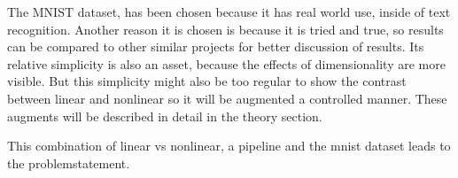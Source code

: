 The MNIST dataset, has been chosen because it has real world use, inside of text recognition. Another reason it is chosen is because it is tried and true, so results can be compared to other similar projects for better discussion of results. Its relative simplicity is also an asset, because the effects of dimensionality are more visible. But this simplicity might also be too regular to show the contrast between linear and nonlinear so it will be augmented a controlled manner. These augments will be described in detail in the theory section. 

This combination of linear vs nonlinear, a pipeline and the mnist dataset leads to the problemstatement.
